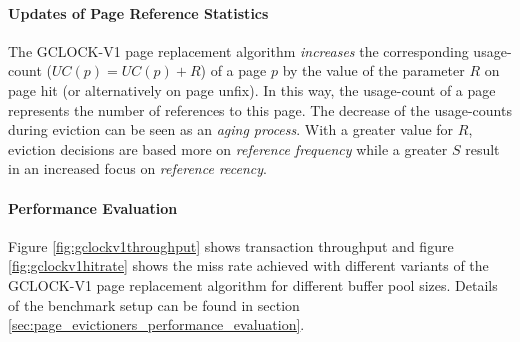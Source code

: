 \paragraph{Updates of Page Reference Statistics}

    The GCLOCK-V1 page replacement algorithm \emph{increases} the corresponding usage-count ($UC\left(p\right) = UC\left(p\right) + R$) of a page $p$ by the value of the parameter $R$ on page hit (or alternatively on page unfix). In this way, the usage-count of a page represents the number of references to this page. The decrease of the usage-counts during eviction can be seen as an \emph{aging process}. With a greater value for $R$, eviction decisions are based more on \emph{reference frequency} while a greater $S$ result in an increased focus on \emph{reference recency}.

\paragraph{Performance Evaluation}

    Figure \ref{fig:gclockv1throughput} shows transaction throughput and figure \ref{fig:gclockv1hitrate} shows the miss rate achieved with different variants of the GCLOCK-V1 page replacement algorithm for different buffer pool sizes. Details of the benchmark setup can be found in section \ref{sec:page_evictioners_performance_evaluation}.

